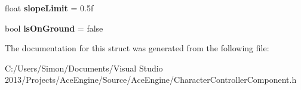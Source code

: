 \begin{DoxyCompactItemize}
\item 
\hypertarget{struct_character_controller_component_aba50ef8c828907c8f9c1043eca6ad326}{}float {\bfseries slope\+Limit} = 0.\+5f\label{struct_character_controller_component_aba50ef8c828907c8f9c1043eca6ad326}

\item 
\hypertarget{struct_character_controller_component_a032257274fe5c5e10e5fec5627e62c3e}{}bool {\bfseries is\+On\+Ground} = false\label{struct_character_controller_component_a032257274fe5c5e10e5fec5627e62c3e}

\end{DoxyCompactItemize}


The documentation for this struct was generated from the following file\+:\begin{DoxyCompactItemize}
\item 
C\+:/\+Users/\+Simon/\+Documents/\+Visual Studio 2013/\+Projects/\+Ace\+Engine/\+Source/\+Ace\+Engine/Character\+Controller\+Component.\+h\end{DoxyCompactItemize}
